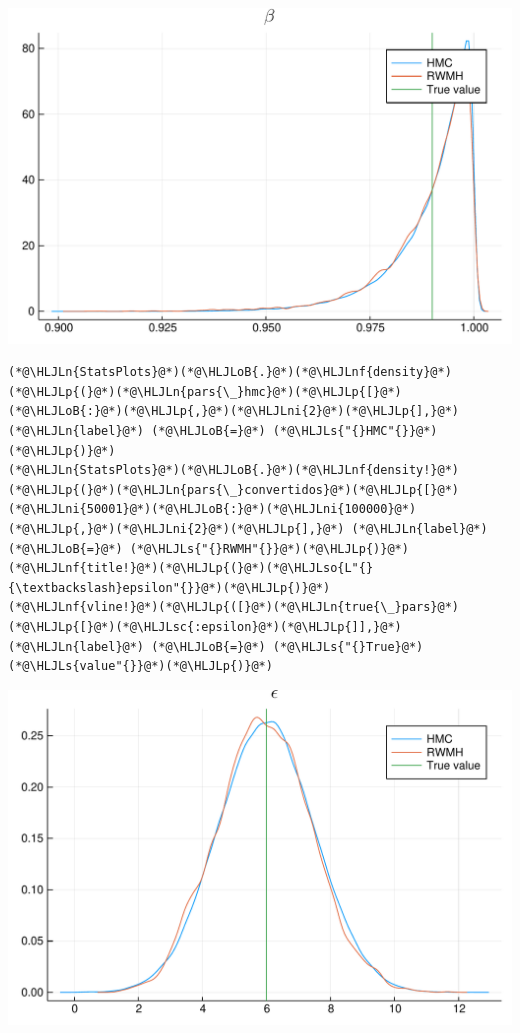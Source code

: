 \documentclass[12pt,a4paper]{article}
\newcommand{\HLJLn}[1]{#1}
\newcommand{\HLJLnf}[1]{\textcolor[RGB]{66,102,213}{#1}}
\newcommand{\HLJLs}[1]{\textcolor[RGB]{201,61,57}{#1}}
\newcommand{\HLJLsc}[1]{\textcolor[RGB]{201,61,57}{#1}}
\newcommand{\HLJLso}[1]{\textcolor[RGB]{201,61,57}{#1}}
\newcommand{\HLJLni}[1]{\textcolor[RGB]{59,151,46}{#1}}
\newcommand{\HLJLoB}[1]{\textcolor[RGB]{102,102,102}{\textbf{#1}}}
\newcommand{\HLJLp}[1]{#1}
\begin{document}
\includegraphics[width=\linewidth]{figures/dsge_and_julia_44_1.pdf}

\begin{lstlisting}
(*@\HLJLn{StatsPlots}@*)(*@\HLJLoB{.}@*)(*@\HLJLnf{density}@*)(*@\HLJLp{(}@*)(*@\HLJLn{pars{\_}hmc}@*)(*@\HLJLp{[}@*)(*@\HLJLoB{:}@*)(*@\HLJLp{,}@*)(*@\HLJLni{2}@*)(*@\HLJLp{],}@*) (*@\HLJLn{label}@*) (*@\HLJLoB{=}@*) (*@\HLJLs{"{}HMC"{}}@*)(*@\HLJLp{)}@*)
(*@\HLJLn{StatsPlots}@*)(*@\HLJLoB{.}@*)(*@\HLJLnf{density!}@*)(*@\HLJLp{(}@*)(*@\HLJLn{pars{\_}convertidos}@*)(*@\HLJLp{[}@*)(*@\HLJLni{50001}@*)(*@\HLJLoB{:}@*)(*@\HLJLni{100000}@*)(*@\HLJLp{,}@*)(*@\HLJLni{2}@*)(*@\HLJLp{],}@*) (*@\HLJLn{label}@*) (*@\HLJLoB{=}@*) (*@\HLJLs{"{}RWMH"{}}@*)(*@\HLJLp{)}@*)
(*@\HLJLnf{title!}@*)(*@\HLJLp{(}@*)(*@\HLJLso{L"{}{\textbackslash}epsilon"{}}@*)(*@\HLJLp{)}@*)
(*@\HLJLnf{vline!}@*)(*@\HLJLp{([}@*)(*@\HLJLn{true{\_}pars}@*)(*@\HLJLp{[}@*)(*@\HLJLsc{:epsilon}@*)(*@\HLJLp{]],}@*) (*@\HLJLn{label}@*) (*@\HLJLoB{=}@*) (*@\HLJLs{"{}True}@*) (*@\HLJLs{value"{}}@*)(*@\HLJLp{)}@*)
\end{lstlisting}

\includegraphics[width=\linewidth]{figures/dsge_and_julia_45_1.pdf}
\end{document}
